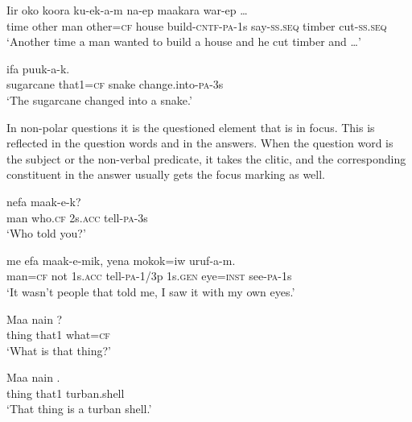\ea%
\label{ex:x1710}
\gll Iir  oko     koora  ku-ek-a-m  na-ep maakara  war-ep  {\dots}\\
time  other  man  other=\textsc{cf}  house  build-\textsc{cntf}-\textsc{pa}-1s  say-\textsc{ss}.\textsc{seq} timber  cut-\textsc{ss}.\textsc{seq}\\
\glt`Another time a man wanted to build a house and he cut timber and {\dots}'
\z


\ea%
\label{ex:x1711}
\gll {}    ifa  puuk-a-k. \\
sugarcane  that1=\textsc{cf}  snake  change.into-\textsc{pa}-3s      \\
\glt`The sugarcane changed into a snake.'
\z


In non-polar questions it is the questioned element that is in focus. This is reflected in the question words and in the answers. When the question word is the subject or the non-verbal predicate, it takes the  clitic, and the corresponding constituent in the answer usually gets the focus marking as well.

\ea%
\label{ex:x1714}
\gll {}   nefa  maak-e-k?\\
man  who.\textsc{cf}  2s.\textsc{acc}  tell-\textsc{pa}-3s      \\
\glt`Who told you?'
\z


\ea%
\label{ex:x1715}
\gll {}  me  efa  maak-e-mik,  yena  mokok=iw  uruf-a-m. \\
man=\textsc{cf}  not  1s.\textsc{acc}  tell-\textsc{pa}-1/3p  1s.\textsc{gen}  eye=\textsc{inst}  see-\textsc{pa}-1s      \\
\glt`It wasn't people that told me, I saw it with my own eyes.'
\z


\ea%
\label{ex:x1712}
\gll Maa  nain  ? \\
thing  that1  what=\textsc{cf}      \\
\glt`What is that thing?'
\z


\ea%
\label{ex:x1713}
\gll Maa  nain  . \\
thing  that1  turban.shell      \\
\glt`That thing is a turban shell.'
\z
{}


